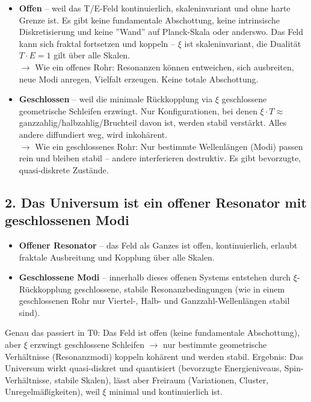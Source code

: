 	\begin{itemize}[label=$\bullet$]
		\item \textbf{Offen} – weil das T/E-Feld kontinuierlich, skaleninvariant und ohne harte Grenze ist. Es gibt keine fundamentale Abschottung, keine intrinsische Diskretisierung und keine ''Wand'' auf Planck-Skala oder anderswo. Das Feld kann sich fraktal fortsetzen und koppeln – $\xi$ ist skaleninvariant, die Dualität $T \cdot E = 1$ gilt über alle Skalen. \\
		$\rightarrow$ Wie ein offenes Rohr: Resonanzen können entweichen, sich ausbreiten, neue Modi anregen, Vielfalt erzeugen. Keine totale Abschottung.
		
		\item \textbf{Geschlossen} – weil die minimale Rückkopplung via $\xi$ geschlossene geometrische Schleifen erzwingt. Nur Konfigurationen, bei denen $\xi \cdot T \approx$ ganzzahlig/halbzahlig/Bruchteil davon ist, werden stabil verstärkt. Alles andere diffundiert weg, wird inkohärent. \\
		$\rightarrow$ Wie ein geschlossenes Rohr: Nur bestimmte Wellenlängen (Modi) passen rein und bleiben stabil – andere interferieren destruktiv. Es gibt bevorzugte, quasi-diskrete Zustände.
	\end{itemize}
	
	\subsection*{2. Das Universum ist ein offener Resonator mit geschlossenen Modi}
	
	\begin{itemize}[label=$\bullet$]
		\item \textbf{Offener Resonator} – das Feld als Ganzes ist offen, kontinuierlich, erlaubt fraktale Ausbreitung und Kopplung über alle Skalen.
		\item \textbf{Geschlossene Modi} – innerhalb dieses offenen Systems entstehen durch $\xi$-Rückkopplung geschlossene, stabile Resonanzbedingungen (wie in einem geschlossenen Rohr nur Viertel-, Halb- und Ganzzahl-Wellenlängen stabil sind).
	\end{itemize}
	
	Genau das passiert in T0: Das Feld ist offen (keine fundamentale Abschottung), aber $\xi$ erzwingt geschlossene Schleifen $\rightarrow$ nur bestimmte geometrische Verhältnisse (Resonanzmodi) koppeln kohärent und werden stabil. Ergebnis: Das Universum wirkt quasi-diskret und quantisiert (bevorzugte Energieniveaus, Spin-Verhältnisse, stabile Skalen), lässt aber Freiraum (Variationen, Cluster, Unregelmäßigkeiten), weil $\xi$ minimal und kontinuierlich ist.
	
